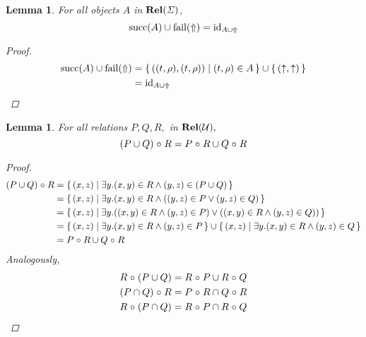 \documentclass{article}
\newtheorem{lemma}[theorem]{Lemma}
\newcommand{\fail}{\ensuremath \text{$\uparrow$}}
\newcommand{\Fail}{\ensuremath \text{$\Uparrow$}}
\newcommand{\Cat}[1]{\ensuremath \mathbf{#1}}
\newcommand{\State}{\ensuremath \mathit{\Sigma} }
\newcommand{\setbuild}[2]{\ensuremath \{\, #1 \mid #2 \,\}}
\newcommand{\setbuildc}[1]{\ensuremath \{\, #1 \,\}}
\newcommand{\id}{\ensuremath \operatorname{id}}
\newcommand{\Rel}{\ensuremath \Cat{Rel}}
\newcommand{\lfail}{\ensuremath \operatorname{fail}}
\newcommand{\lsucc}{\ensuremath \operatorname{succ}}
\newcommand{\comp}{\ensuremath \mathrel{\circ}}
\begin{document}
\begin{lemma} \normalfont
  For all objects $A$ in $\Rel(\State)$, \[ \lsucc(A) \cup \lfail(\Fail) = \id_{A \cup \Fail} \]
  \begin{proof}
    \begin{align*}
      \lsucc(A) \cup \lfail(\Fail) &= \setbuild{ ((t,\rho),(t,\rho)) }{ (t,\rho) \in A } \cup \setbuildc{ (\fail,\fail) } \\
                                   &= \id_{A \cup \Fail} 
    \end{align*}
  \end{proof}
\end{lemma}

\begin{lemma} \normalfont
  For all relations $P,Q,R,$ in $\Rel(\mathcal{U}),$ \[(P \cup Q) \comp R = P \comp R \cup Q \comp R\]
\begin{proof}
  \begin{align*}
    (P \cup Q) \comp R &= \setbuild{ (x,z) }{ \exists y. (x,y) \in R \land (y,z) \in (P \cup Q) } \\
                       &= \setbuild{ (x,z) }{ \exists y. (x,y) \in R \land ((y,z) \in P \lor (y,z) \in Q) } \\
                       &= \setbuild{ (x,z) }{ \exists y. ((x,y) \in R \land (y,z) \in P) \lor ((x,y) \in R \land (y,z) \in Q)) } \\
                       &= \setbuild{ (x,z) }{ \exists y. (x,y) \in R \land (y,z) \in P } \cup  \setbuild{ (x,z) }{ \exists y. (x,y) \in R \land (y,z) \in Q } \\
                       &= P \comp R \cup Q \comp R
  \end{align*}
  Analogously,
  \begin{align*}
    R \comp (P \cup Q) &= R \comp P \cup R \comp Q \\
    (P \cap Q) \comp R &= P \comp R \cap Q \comp R \\
    R \comp (P \cap Q) &= R \comp P \cap R \comp Q
  \end{align*}
\end{proof}
\end{lemma}
\end{document}
